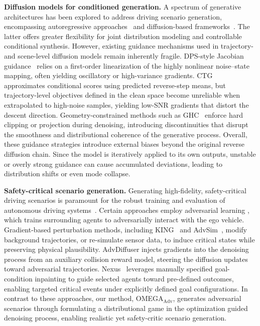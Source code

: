 \documentclass[10pt,twocolumn,letterpaper]{article}
\theoremstyle{plain}
\theoremstyle{remark}
\renewcommand{\paragraph}[1]{\vspace{.5em}\noindent\textbf{#1.}}
\begin{document}
\paragraph{Diffusion models for conditioned generation}
A spectrum of generative architectures has been explored to address driving scenario generation, encompassing autoregressive approaches~\cite{seff2023motionlm,hu2024solving} and diffusion-based frameworks~\cite{jiang2024scenediffuser,tan2025scenediffuser++,zhou2025decoupled,chitta2024sledge}. The latter offers greater flexibility for joint distribution modeling and controllable conditional synthesis. However, existing guidance mechanisms used in trajectory- and scene-level diffusion models remain inherently fragile. DPS-style Jacobian guidance~\cite{zheng2025diffusion, chung2022diffusion} relies on a first-order linearization of the highly nonlinear noise–state mapping, often yielding oscillatory or high-variance gradients. CTG~\cite{zhong2022guided} approximates conditional scores using predicted reverse-step means, but trajectory-level objectives defined in the clean space become unreliable when extrapolated to high-noise samples, yielding low-SNR gradients that distort the descent direction. Geometry-constrained methods such as GHC~\cite{jiang2024scenediffuser} enforce hard clipping or projection during denoising, introducing discontinuities that disrupt the smoothness and distributional coherence of the generative process. Overall, these guidance strategies introduce external biases beyond the original reverse diffusion chain. Since the model is iteratively applied to its own outputs, unstable or overly strong guidance can cause accumulated deviations, leading to distribution shifts or even mode collapse.


\paragraph{Safety-critical scenario generation}
Generating high-fidelity, safety-critical driving scenarios is paramount for the robust training and evaluation of autonomous driving systems~\cite{Hu2023CVPR,Chen2024PAMI,liu2025reinforced}. Certain approaches employ adversarial learning \cite{zhang2023cat,feng2023dense}, which trains surrounding agents to adversarially interact with the ego vehicle. Gradient-based perturbation methods, including KING~\cite{hanselmann2022king} and AdvSim~\cite{wang2021advsim}, modify background trajectories, or re-simulate sensor data, to induce critical states while preserving physical plausibility. AdvDiffuser \cite{xie2024advdiffuser} injects gradients into the denoising process from an auxiliary collision reward model, steering the diffusion updates toward adversarial trajectories. Nexus~\cite{zhou2025decoupled} leverages manually specified goal-condition inpainting to guide selected agents toward pre-defined outcomes, enabling targeted critical events under explicitly defined goal configurations. In contrast to these approaches, our method, OMEGA$_\mathrm{Adv}$, generates adversarial scenarios through formulating a distributional game in the optimization guided denoising process, enabling realistic yet safety-critic scenario generation.
\end{document}
